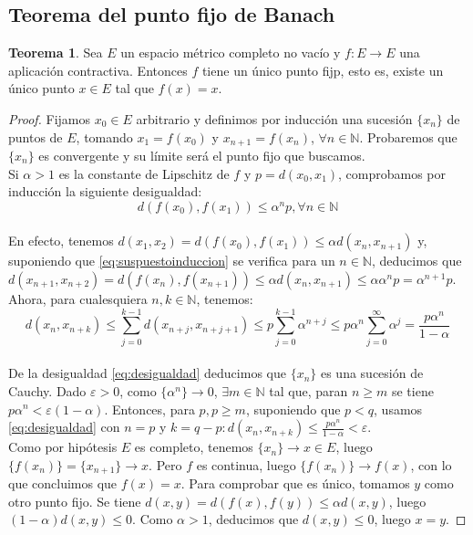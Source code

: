 \documentclass[11pt,titlepage,a4paper]{article}
\theoremstyle{definition}
\newtheorem*{teo}{Teorema}
\begin{document}
\subsection{Teorema del punto fijo de Banach}

\begin{teo}
Sea $E$ un espacio métrico completo no vacío y $f:E\to E$ una aplicación contractiva.
Entonces $f$ tiene un único punto fijp, esto es, existe un único punto $x\in E$
tal que $f(x)=x$.
\end{teo}
\begin{proof}
Fijamos $x_0\in E$ arbitrario y definimos por inducción una sucesión $\{x_n\}$ de
puntos de $E$, tomando $x_1=f(x_0)$ y $x_{n+1}=f(x_n)$, $\forall n\in\mathbb{N}$.
Probaremos que $\{x_n\}$ es convergente y su límite será el punto fijo que buscamos.
\\
Si $\alpha>1$ es la constante de Lipschitz de $f$ y $p=d(x_0,x_1)$, comprobamos
por inducción la siguiente desigualdad:
\begin{equation}\label{eq:suspuestoinduccion}
d(f(x_0),f(x_1))\leq\alpha^np,\forall n\in\mathbb{N}
\end{equation}
\\
En efecto, tenemos $d(x_1,x_2)=d(f(x_0),f(x_1))\leq\alpha d(x_n,x_{n+1})$ y, 
suponiendo que \eqref{eq:suspuestoinduccion} se verifica para un $n\in\mathbb{N}$,
deducimos que $d(x_{n+1},x_{n+2})=d(f(x_n),f(x_{n+1}))\leq\alpha d(x_n,x_{n+1})
\leq\alpha\alpha^np=\alpha^{n+1}p$.
\\
Ahora, para cualesquiera $n,k\in\mathbb{N}$, tenemos:
\begin{equation}\label{eq:desigualdad}
d(x_n,x_{n+k})\leq\sum_{j=0}^{k-1}d(x_{n+j},x_{n+j+1})\leq p\sum_{j=0}^{k-1}\alpha^{n+j}
\leq p\alpha^n\sum_{j=0}^{\infty}\alpha^j=\frac{p\alpha^n}{1-\alpha}
\end{equation}
\\
De la desigualdad \eqref{eq:desigualdad} deducimos que $\{x_n\}$ es una sucesión de
Cauchy. Dado $\varepsilon>0$, como $\{\alpha^n\}\to 0$, $\exists m\in\mathbb{N}$ tal que,
paran $n\geq m$ se tiene $p\alpha^n<\varepsilon(1-\alpha)$. Entonces, para $p,p\geq m$,
suponiendo que $p<q$, usamos \eqref{eq:desigualdad} con $n=p$ y $k=q-p:d(x_n,x_{n+k})
\leq\frac{p\alpha^n}{1-\alpha}<\varepsilon$.
\\
Como por hipótesis $E$ es completo, tenemos $\{x_n\}\to x\in E$, luego $\{f(x_n)\}
=\{x_{n+1}\}\to x$. Pero $f$ es continua, luego $\{f(x_n)\}\to f(x)$, con lo que concluimos
que $f(x)=x$. Para comprobar que es único, tomamos $y$ como otro punto fijo. Se tiene
$d(x,y)=d(f(x),f(y))\leq\alpha d(x,y)$, luego $(1-\alpha)d(x,y)\leq 0$. Como $\alpha>1$,
deducimos que $d(x,y)\leq 0$, luego $x=y$.
\end{proof}
\end{document}

